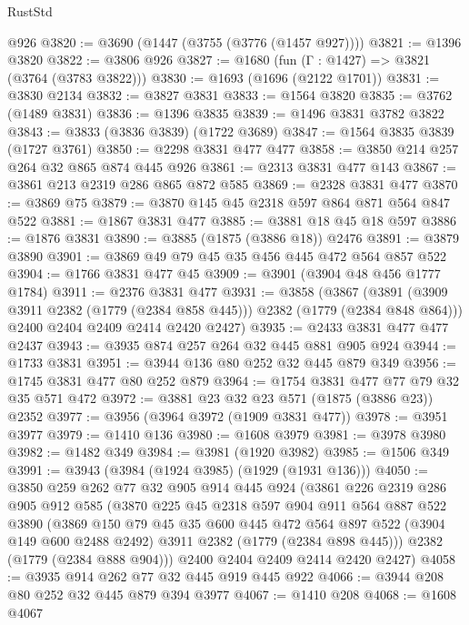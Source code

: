 \begin{lexlean}{RustStd}
\begin{coremodule}
    @926
@3820 := @3690 (@1447 (@3755 (@3776 (@1457 @927))))
@3821 := @1396 @3820
@3822 := @3806 @926
@3827 := @1680 (fun (Γ : @1427) => @3821 (@3764 (@3783 @3822)))
@3830 := @1693 (@1696 (@2122 @1701))
@3831 := @3830 @2134
@3832 := @3827 @3831
@3833 := @1564 @3820
@3835 := @3762 (@1489 @3831)
@3836 := @1396 @3835
@3839 := @1496 @3831 @3782 @3822
@3843 := @3833 (@3836 @3839) (@1722 @3689)
@3847 := @1564 @3835 @3839 (@1727 @3761)
@3850 := @2298 @3831 @477 @477
@3858 := @3850 @214 @257 @264 @32 @865 @874 @445 @926
@3861 := @2313 @3831 @477 @143
@3867 := @3861 @213 @2319 @286 @865 @872 @585
@3869 := @2328 @3831 @477
@3870 := @3869 @75
@3879 := @3870 @145 @45 @2318 @597 @864 @871 @564 @847 @522
@3881 := @1867 @3831 @477
@3885 := @3881 @18 @45 @18 @597
@3886 := @1876 @3831
@3890 := @3885 (@1875 (@3886 @18)) @2476
@3891 := @3879 @3890
@3901 := @3869 @49 @79 @45 @35 @456 @445 @472 @564 @857 @522
@3904 := @1766 @3831 @477 @45
@3909 := @3901 (@3904 @48 @456 @1777 @1784)
@3911 := @2376 @3831 @477
@3931 := @3858
    (@3867
      (@3891 (@3909 @3911 @2382 (@1779 (@2384 @858 @445))) @2382 (@1779 (@2384 @848 @864)))
      @2400
      @2404
      @2409
      @2414
      @2420
      @2427)
@3935 := @2433 @3831 @477 @477 @2437
@3943 := @3935 @874 @257 @264 @32 @445 @881 @905 @924
@3944 := @1733 @3831
@3951 := @3944 @136 @80 @252 @32 @445 @879 @349
@3956 := @1745 @3831 @477 @80 @252 @879
@3964 := @1754 @3831 @477 @77 @79 @32 @35 @571 @472
@3972 := @3881 @23 @32 @23 @571 (@1875 (@3886 @23)) @2352
@3977 := @3956 (@3964 @3972 (@1909 @3831 @477))
@3978 := @3951 @3977
@3979 := @1410 @136
@3980 := @1608 @3979
@3981 := @3978 @3980
@3982 := @1482 @349
@3984 := @3981 (@1920 @3982)
@3985 := @1506 @349
@3991 := @3943 (@3984 (@1924 @3985) (@1929 (@1931 @136)))
@4050 := @3850
    @259
    @262
    @77
    @32
    @905
    @914
    @445
    @924
    (@3861
      @226
      @2319
      @286
      @905
      @912
      @585
      (@3870
        @225
        @45
        @2318
        @597
        @904
        @911
        @564
        @887
        @522
        @3890
        (@3869
          @150
          @79
          @45
          @35
          @600
          @445
          @472
          @564
          @897
          @522
          (@3904 @149 @600 @2488 @2492)
          @3911
          @2382
          (@1779 (@2384 @898 @445)))
        @2382
        (@1779 (@2384 @888 @904)))
      @2400
      @2404
      @2409
      @2414
      @2420
      @2427)
@4058 := @3935 @914 @262 @77 @32 @445 @919 @445 @922
@4066 := @3944 @208 @80 @252 @32 @445 @879 @394 @3977
@4067 := @1410 @208
@4068 := @1608 @4067

\end{coremodule}
\end{lexlean}
